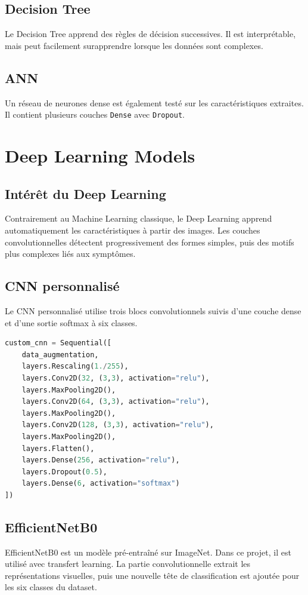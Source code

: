 \documentclass[12pt,a4paper]{report}
\begin{document}
\section{Decision Tree}
Le Decision Tree apprend des règles de décision successives. Il est interprétable, mais peut facilement surapprendre lorsque les données sont complexes.

\section{ANN}
Un réseau de neurones dense est également testé sur les caractéristiques extraites. Il contient plusieurs couches \texttt{Dense} avec \texttt{Dropout}.

\chapter{Deep Learning Models}

\section{Intérêt du Deep Learning}
Contrairement au Machine Learning classique, le Deep Learning apprend automatiquement les caractéristiques à partir des images. Les couches convolutionnelles détectent progressivement des formes simples, puis des motifs plus complexes liés aux symptômes.

\section{CNN personnalisé}
Le CNN personnalisé utilise trois blocs convolutionnels suivis d'une couche dense et d'une sortie softmax à six classes.

\begin{lstlisting}[language=Python, caption={Architecture simplifiée du CNN personnalisé}]
custom_cnn = Sequential([
    data_augmentation,
    layers.Rescaling(1./255),
    layers.Conv2D(32, (3,3), activation="relu"),
    layers.MaxPooling2D(),
    layers.Conv2D(64, (3,3), activation="relu"),
    layers.MaxPooling2D(),
    layers.Conv2D(128, (3,3), activation="relu"),
    layers.MaxPooling2D(),
    layers.Flatten(),
    layers.Dense(256, activation="relu"),
    layers.Dropout(0.5),
    layers.Dense(6, activation="softmax")
])
\end{lstlisting}

\section{EfficientNetB0}
EfficientNetB0 est un modèle pré-entraîné sur ImageNet. Dans ce projet, il est utilisé avec transfert learning. La partie convolutionnelle extrait les représentations visuelles, puis une nouvelle tête de classification est ajoutée pour les six classes du dataset.
\end{document}
